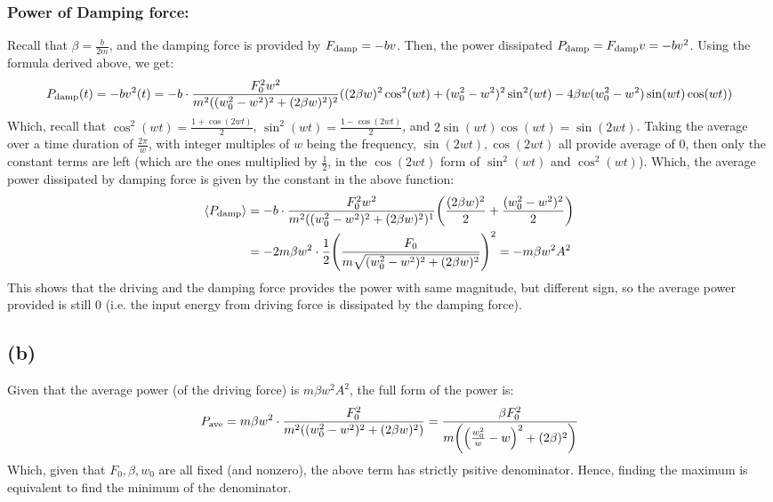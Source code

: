 \documentclass{article}
\DeclarePairedDelimiter{\paran}{(}{)}%
\DeclarePairedDelimiter{\bracket}{\langle}{\rangle}
\begin{document}
\subsubsection*{Power of Damping force:}
Recall that $\beta=\frac{b}{2m}$, and the damping force is provided by $F_{\textmd{damp}} = -bv$. Then, the power dissipated $P_{\textmd{damp}}=F_{\textmd{damp}}v = -bv^2$. Using the formula derived above, we get:
\begin{equation}
    P_{\textmd{damp}}(t)=-bv^2(t) = -b\cdot \frac{F_0^2w^2}{m^2((w_0^2-w^2)^2+(2\beta w)^2)^2}((2\beta w)^2\cos^2(wt)+(w_0^2-w^2)^2\sin^2(wt)-4\beta w(w_0^2-w^2)\sin(wt)\cos(wt))
\end{equation}
Which, recall that $\cos^2(wt)=\frac{1+\cos(2wt)}{2}$, $\sin^2(wt)=\frac{1-\cos(2wt)}{2}$, and $2\sin(wt)\cos(wt)=\sin(2wt)$. Taking the average over a time duration of $\frac{2\pi}{w}$, with integer multiples of $w$ being the frequency, $\sin(2wt),\cos(2wt)$ all provide average of $0$, then only the constant terms are left (which are the ones multiplied by $\frac{1}{2}$, in the $\cos(2wt)$ form of $\sin^2(wt)$ and $\cos^2(wt)$). Which, the average power dissipated by damping force is given by the constant in the above function:
\begin{align}
    \bracket*{P_\textmd{damp}} &= -b\cdot\frac{F_0^2w^2}{m^2((w_0^2-w^2)^2+(2\beta w)^2)^1}\paran*{\frac{(2\beta w)^2}{2}+\frac{(w_0^2-w^2)^2}{2}}\\
    &= -2m\beta w^2\cdot\frac{1}{2}\paran*{\frac{F_0}{m\sqrt{(w_0^2-w^2)^2+(2\beta w)^2}}}^2 = -m\beta w^2A^2
\end{align}
This shows that the driving and the damping force provides the power with same magnitude, but different sign, so the average power provided is still $0$ (i.e. the input energy from driving force is dissipated by the damping force).

\subsection*{(b)}
Given that the average power (of the driving force) is $m\beta w^2A^2$, the full form of the power is:
\begin{eqnarray}
    P_\textmd{ave} = m\beta w^2\cdot\frac{F_0^2}{m^2((w_0^2-w^2)^2+(2\beta w)^2)} = \frac{\beta F_0^2}{m\paran*{\paran*{\frac{w_0^2}{w}-w}^2+(2\beta)^2}}
\end{eqnarray}
Which, given that $F_0,\beta,w_0$ are all fixed (and nonzero), the above term has strictly psitive denominator. Hence, finding the maximum is equivalent to find the minimum of the denominator.
\end{document}

